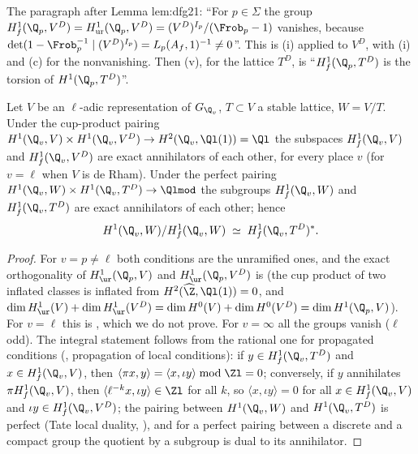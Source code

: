 \begin{paperlink}
The paragraph after Lemma lem:dfg21: ``For $p\in\Sigma$ the group $H^1_f(\Q_p,V^D)=H^1_{\mathrm{ur}}(\Q_p,V^D)=(V^D)^{I_p}/(\Frob_p-1)$ vanishes, because
$\det(1-\Frob_p^{-1}\mid(V^D)^{I_p})=L_p(A_f,1)^{-1}\ne0$''. This is (i) applied to $V^D$, with (i) and
(c) for the nonvanishing. Then (v), for the lattice $T^D$, is ``$H^1_f(\Q_p,T^D)$ is the torsion of $H^1(\Q_p,T^D)$''.
\end{paperlink}

\begin{proposition}\label{prop:blochkato:local-duality-f}
Let $V$ be an $\ell$-adic representation of $G_{\Q_v}$, $T\subset V$ a stable lattice, $W=V/T$. Under the cup-product pairing
$H^1(\Q_v,V)\times H^1(\Q_v,V^D)\to H^2(\Q_v,\Ql(1))=\Ql$ the subspaces $H^1_f(\Q_v,V)$ and $H^1_f(\Q_v,V^D)$ are exact annihilators of each other, for every place $v$
(for $v=\ell$ when $V$ is de Rham). Under the perfect pairing $H^1(\Q_v,W)\times H^1(\Q_v,T^D)\to\Qlmod$ the subgroups $H^1_f(\Q_v,W)$ and $H^1_f(\Q_v,T^D)$ are exact
annihilators of each other; hence
\[
H^1(\Q_v,W)/H^1_f(\Q_v,W)\;\simeq\;H^1_f(\Q_v,T^D)^*.
\]
\end{proposition}

\begin{proof}
For $v=p\ne\ell$ both conditions are the unramified ones, and the exact orthogonality of $H^1_{\ur}(\Q_p,V)$ and $H^1_{\ur}(\Q_p,V^D)$ is  (the cup product
of two inflated classes is inflated from $H^2(\widehat\Z,\Ql(1))=0$, and $\dim H^1_{\ur}(V)+\dim H^1_{\ur}(V^D)=\dim H^0(V)+\dim H^0(V^D)=\dim H^1(\Q_p,V)$). For $v=\ell$ this is
\cite[Section 3]{BlochKato}, which we do not prove. For $v=\infty$ all the groups vanish ($\ell$ odd). The integral statement follows from the rational one for
propagated conditions (, propagation of local conditions): if $y\in H^1_f(\Q_v,T^D)$ and $x\in H^1_f(\Q_v,V)$, then
$\langle\pi x,y\rangle=\langle x,\iota y\rangle\bmod\Zl=0$; conversely, if $y$ annihilates $\pi H^1_f(\Q_v,V)$, then $\langle\ell^{-k}x,\iota y\rangle\in\Zl$ for all $k$, so $\langle x,\iota y\rangle=0$ for
all $x\in H^1_f(\Q_v,V)$ and $\iota y\in H^1_f(\Q_v,V^D)$; the pairing between $H^1(\Q_v,W)$ and $H^1(\Q_v,T^D)$ is perfect (Tate local duality, ), and for a perfect
pairing between a discrete and a compact group the quotient by a subgroup is dual to its annihilator.
\end{proof}


